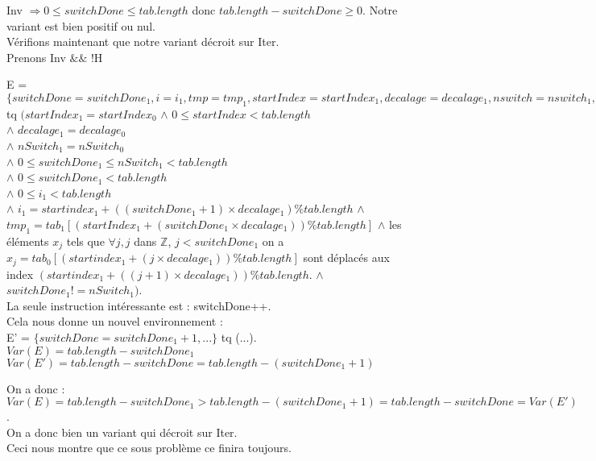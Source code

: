 Inv $\Rightarrow 0 \leq switchDone \leq tab.length$ donc $tab.length - switchDone \geq 0$. Notre variant est bien positif ou nul.\\ 

Vérifions maintenant que notre variant décroit sur Iter.\\

Prenons Inv $\&\&$ !H 

E = $\{ switchDone = switchDone_{1}, i = i_{1}, tmp = tmp_{1}, startIndex = startIndex_{1}, decalage = decalage_{1}, nswitch = nswitch_{1}, tab = tab_{1}\}$\\
tq $(startIndex_{1} = startIndex_{0}$
$\wedge$ $0 \leq startIndex < tab.length$\\
$\wedge$ $decalage_{1} = decalage_{0}$\\
$\wedge$ $nSwitch_{1} = nSwitch_{0}$\\
$\wedge$ $0 \leq switchDone_{1} \leq nSwitch_{1} < tab.length$\\ 
$\wedge$ $0 \leq switchDone_{1} < tab.length$\\
$\wedge$ $0 \leq i_{1} < tab.length$\\
$\wedge$ $i_{1} = startindex_{1} + ((switchDone_{1}+1)\times decalage_{1}) \% tab.length$
$\wedge$ $tmp_{1} = tab_{1}[(startIndex_{1} + (switchDone_{1}\times decalage_{1})) \% tab.length]$
$\wedge$ les éléments $x_{j}$ tels que $\forall j, j$ dans $\mathbb{Z}$, $j<switchDone_{1}$ on a $x_{j}=tab_{0}[(startindex_{1} + (j\times decalage_{1})) \% tab.length]$ sont déplacés aux index $(startindex_{1} + ((j+1)\times decalage_{1})) \% tab.length$.
$\wedge$ $switchDone_{1} != nSwitch_{1})$.\\

La seule instruction intéressante est : switchDone++.\\
Cela nous donne un nouvel environnement :\\

E' = $\{switchDone = switchDone_{1}+1, ...\}$ tq (...).\\

$Var(E) = tab.length - switchDone_{1}$
$Var(E') = tab.length - switchDone = tab.length - (switchDone_{1}+1)$

On a donc : $Var(E) = tab.length - switchDone_{1} > tab.length - (switchDone_1 +1) = tab.length - switchDone = Var(E')$.\\

On a donc bien un variant qui décroit sur Iter.\\

Ceci nous montre que ce sous problème ce finira toujours. 




